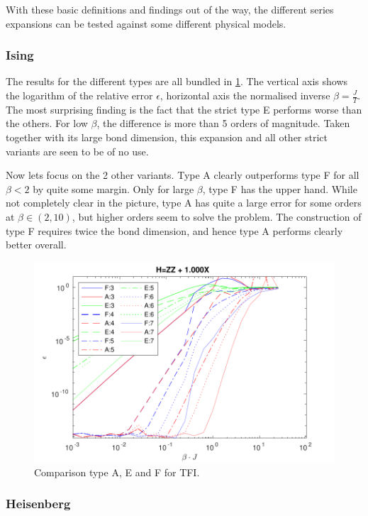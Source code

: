 With these basic definitions and findings out of the way, the different series expansions can be tested against some different physical models.

\subsubsection{Ising}

The results for the different types are all bundled in \cref{fig:benchmark:tising}. The vertical axis shows the logarithm of the relative error $\epsilon$, horizontal axis the normalised inverse $\beta= \frac{J}{T}$. The most surprising finding is the fact that the strict type E performs worse than the others. For low $\beta$, the difference is more than 5 orders of magnitude. Taken together with its large bond dimension, this expansion  and all other strict variants are seen to be of no use.

Now lets focus on the 2 other variants. Type A clearly outperforms type F for all $\beta<2$ by quite some margin. Only for large $\beta$, type F has the upper hand. While not completely clear in the picture, type A has quite a large error for some orders at $\beta \in (2,10) $, but higher orders seem to solve the problem. The construction of type F requires twice the bond dimension, and hence type A performs clearly better overall.

\begin{figure}[h!]
    \center
    \includegraphics[width=\textwidth]{Figuren/benchmarking/t_ising.pdf}
    \caption{Comparison type A, E and F for \Gls{TFI}. }
    \label{fig:benchmark:tising}
\end{figure}

\subsubsection{Heisenberg}

